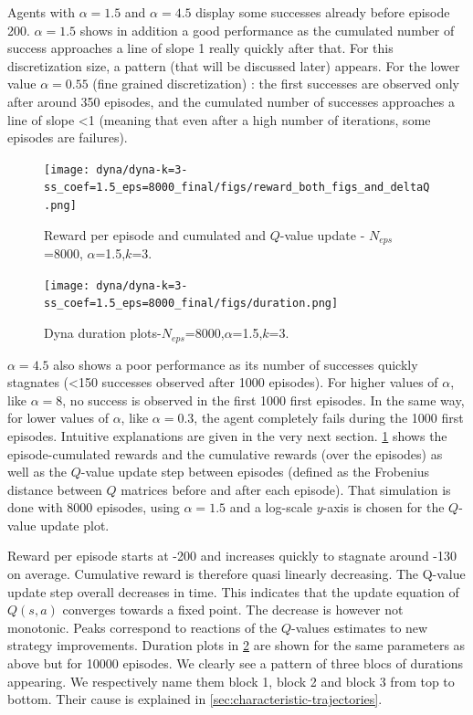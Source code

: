 \documentclass[a4paper, 12pt,oneside]{article}
\begin{document}
        Agents with $\alpha=1.5$ and $\alpha=4.5$ display some successes already before episode 200. $\alpha=1.5$ shows in addition a good performance as the cumulated number of success approaches a line of slope 1 really quickly after that. For this discretization size, a pattern (that will be discussed later) appears. For the lower value $\alpha=0.55$ (fine grained discretization) : the first successes are observed only after around 350 episodes, and the cumulated number of successes approaches a line of slope <1 (meaning that even after a high number of iterations, some episodes are failures). 
        \begin{figure}[h]
            \centering
            \texttt{[image: dyna/dyna-k=3-ss\_coef=1.5\_eps=8000\_final/figs/reward\_both\_figs\_and\_deltaQ.png]}
            \caption{Reward per episode and cumulated and $Q$-value update - $N_{eps}$=8000, $\alpha$=1.5,$k$=3.}
            \label{fig:reward-both-figs-and-deltaQ}
        \end{figure}

        \begin{figure}
            \centering
            \texttt{[image: dyna/dyna-k=3-ss\_coef=1.5\_eps=8000\_final/figs/duration.png]}
            \caption{Dyna duration plots-$N_{eps}$=8000,$\alpha$=1.5,$k$=3.}
            \label{long-duration}
        \end{figure}
        $\alpha=4.5$ also shows a poor performance as its number of successes quickly stagnates (<150 successes observed after 1000 episodes). 
        For higher values of $\alpha$, like $\alpha=8$, no success is observed in the first 1000 first episodes. In the same way, for lower values of $\alpha$, like $\alpha=0.3$, the agent completely fails during the 1000 first episodes. Intuitive explanations are given in the very next section.  
        \ref{fig:reward-both-figs-and-deltaQ} shows the episode-cumulated rewards and the cumulative rewards (over the episodes) as well as the $Q$-value update step between episodes (defined as the Frobenius distance between $Q$ matrices before and after each episode). That simulation is done with 8000 episodes, using $\alpha=1.5$ and a log-scale $y$-axis is chosen for the $Q$-value update plot.

        Reward per episode starts at -200 and increases quickly to stagnate around -130 on average. Cumulative reward is therefore quasi linearly decreasing. 
        The Q-value update step overall decreases in time. This indicates that the update equation of $Q(s,a)$ converges towards a fixed point. The decrease is however not monotonic. Peaks correspond to reactions of the $Q$-values estimates to new strategy improvements.
        Duration plots in \ref{long-duration} are shown for the same parameters as above but for 10000 episodes. We clearly see a pattern of three blocs of durations appearing. We respectively name them block 1, block 2 and block 3 from top to bottom. Their cause is explained in \ref{sec:characteristic-trajectories}.
        
\end{document}
